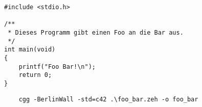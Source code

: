 

\usepackage{lipsum}


 

%
\subtask{}
\lipsum[1][1-4]

\subtask{}
\lipsum[2][2-3]
\begin{verbatim}
#include <stdio.h>

/**
 * Dieses Programm gibt einen Foo an die Bar aus.
 */
int main(void)
{
    printf("Foo Bar!\n");
    return 0;
}
\end{verbatim}
 
\subtask{}
\lipsum[2][4]
%
\subtask{}
\lipsum[3][1-5]
%
\begin{verbatim}
    cgg -BerlinWall -std=c42 .\foo_bar.zeh -o foo_bar 
\end{verbatim}
%
\lipsum[3][6]

 
 
